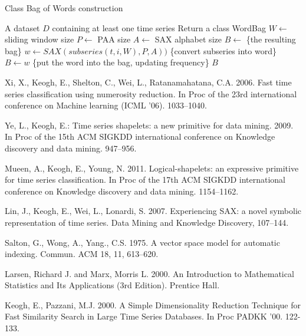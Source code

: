 \documentclass{llncs}
\begin{document}
\begin{algorithm}
\caption{Class Bag of Words construction}
\label{alg1}
\begin{algorithmic}[1]
\REQUIRE A dataset $D$ containing at least one time series
\ENSURE Return a class WordBag
\STATE $W \leftarrow$ sliding window size
\STATE $P \leftarrow$ PAA size
\STATE $A \leftarrow$ SAX alphabet size
\STATE $B \leftarrow$ \{the resulting bag\}
 \STATE $w \leftarrow SAX(subseries(t,i,W), P, A))$ \{convert subseries into word\}
 \STATE $B \leftarrow w$ \{put the word into the bag, updating frequency\}
 \ENDFOR
\ENDFOR
\RETURN $B$
\end{algorithmic}
\end{algorithm}

%
%
\begin{thebibliography}{5}

%

Xi, X., Keogh, E., Shelton, C., Wei, L., Ratanamahatana, C.A. 2006. 
Fast time series classification using numerosity reduction. 
In Proc of the 23rd international conference on Machine learning (ICML '06). 1033--1040.

Ye, L., Keogh, E.:
Time series shapelets: a new primitive for data mining. 2009.
In Proc of the 15th ACM SIGKDD international conference on Knowledge discovery and data
mining. 947--956.

Mueen, A., Keogh, E., Young, N. 2011.
Logical-shapelets: an expressive primitive for time series classification.
In Proc of the 17th ACM SIGKDD international conference on Knowledge discovery and data
mining. 1154--1162.

Lin, J., Keogh, E., Wei, L., Lonardi, S. 2007.
Experiencing SAX: a novel symbolic representation of time series.
Data Mining and Knowledge Discovery, 107--144.

Salton, G., Wong, A., Yang., C.S. 1975.
A vector space model for automatic indexing. 
Commun. ACM 18, 11, 613--620.

Larsen, Richard J. and Marx, Morris L. 2000. 
An Introduction to Mathematical Statistics and Its Applications (3rd Edition).
Prentice Hall.

Keogh, E., Pazzani, M.J. 2000.
A Simple Dimensionality Reduction Technique for Fast Similarity Search in Large Time Series Databases. 
In Proc PADKK '00. 122-133.


\end{thebibliography}
\end{document}
